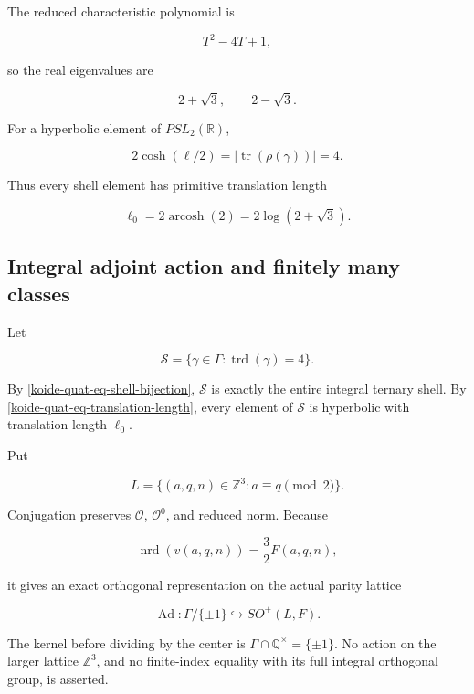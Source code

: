 The reduced characteristic polynomial is

\[
 T^2-4T+1,
\]

so the real eigenvalues are

\begin{equation}\label{koide-quat-eq-eigenvalues}
 2+\sqrt3,\qquad 2-\sqrt3.
\end{equation}

For a hyperbolic element of \(PSL_2(\mathbb R)\),

\[
 2\cosh(\ell/2)=|\operatorname{tr}(\rho(\gamma))|=4.
\]

Thus every shell element has primitive translation length

\begin{equation}\label{koide-quat-eq-translation-length}
 \boxed{
 \ell_0=2\operatorname{arcosh}(2)
       =2\log(2+\sqrt3).}
\end{equation}

\subsection{Integral adjoint action and finitely many classes}\label{koide-quat-integral-adjoint-action-and-finitely-many-classes}

Let

\[
 \mathscr S
 =\{\gamma\in\Gamma:\operatorname{trd}(\gamma)=4\}.
\]

By \eqref{koide-quat-eq-shell-bijection}, \(\mathscr S\) is exactly the entire integral ternary shell. By \eqref{koide-quat-eq-translation-length}, every element of \(\mathscr S\) is hyperbolic with translation length \(\ell_0\).

Put

\[
 L=\{(a,q,n)\in\mathbb Z^3:a\equiv q\pmod2\}.
\]

Conjugation preserves \(\mathcal O\), \(\mathcal O^0\), and reduced norm. Because

\[
 \operatorname{nrd}(v(a,q,n))=\frac32F(a,q,n),
\]

it gives an exact orthogonal representation on the actual parity lattice

\begin{equation}\label{koide-quat-eq-adjoint-representation}
 \operatorname{Ad}:\Gamma/\{\pm1\}
 \hookrightarrow SO^+(L,F).
\end{equation}

The kernel before dividing by the center is \(\Gamma\cap\mathbb Q^\times=\{\pm1\}\). No action on the larger lattice \(\mathbb Z^3\), and no finite-index equality with its full integral orthogonal group, is asserted.

